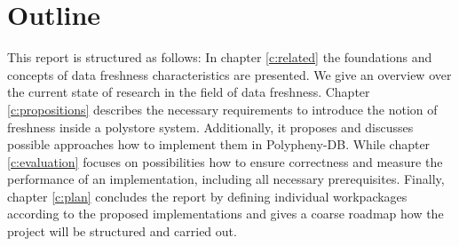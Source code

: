 \section{Outline}
This report is structured as follows:
In chapter \ref{c:related} the foundations and concepts of data freshness characteristics are presented.
We give an overview over the current state of research in the field of data freshness.
Chapter \ref{c:propositions} describes the necessary requirements to introduce the notion of freshness inside a polystore system. Additionally, it proposes and discusses
possible approaches how to implement them in Polypheny-DB.
While chapter \ref{c:evaluation} focuses on possibilities how to ensure correctness and measure the performance of an implementation, including all necessary prerequisites.
Finally, chapter \ref{c:plan} concludes the report by defining individual workpackages according to the proposed
implementations and gives a coarse roadmap how the project will be structured and carried out.


